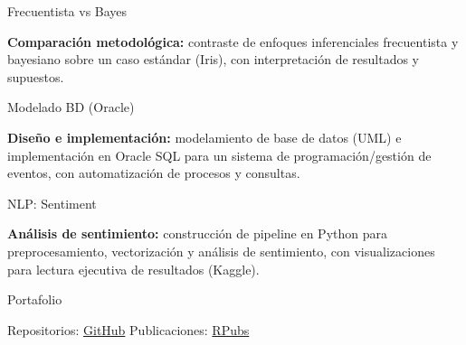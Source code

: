 \begin{cvskills}
  \cvskill
    {\begin{minipage}[t]{0.28\linewidth}Frecuentista vs Bayes\end{minipage}}
    {\parbox[t]{0.72\linewidth}{\textbf{Comparación metodológica:} contraste de enfoques inferenciales frecuentista y bayesiano sobre un caso estándar (Iris), con interpretación de resultados y supuestos.}}

  \cvskill
    {\begin{minipage}[t]{0.28\linewidth}Modelado BD (Oracle)\end{minipage}}
    {\parbox[t]{0.72\linewidth}{\textbf{Diseño e implementación:} modelamiento de base de datos (UML) e implementación en Oracle SQL para un sistema de programación/gestión de eventos, con automatización de procesos y consultas.}}

  \cvskill
    {\begin{minipage}[t]{0.28\linewidth}NLP: Sentiment\end{minipage}}
    {\parbox[t]{0.72\linewidth}{\textbf{Análisis de sentimiento:} construcción de pipeline en Python para preprocesamiento, vectorización y análisis de sentimiento, con visualizaciones para lectura ejecutiva de resultados (Kaggle).}}

  \cvskill
    {\begin{minipage}[t]{0.28\linewidth}Portafolio\end{minipage}}
    {\parbox[t]{0.72\linewidth}{Repositorios: \href{https://github.com/RamiroSeb2021}{GitHub} \quad\textbar\quad Publicaciones: \href{https://rpubs.com/juanayaramiro}{RPubs}}}

\end{cvskills}

